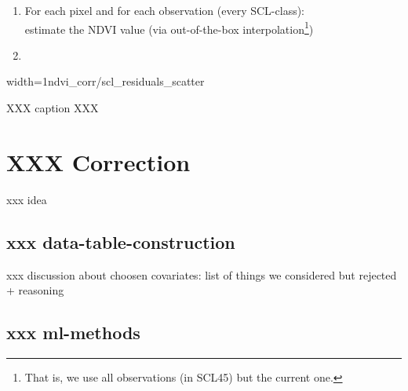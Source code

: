 \begin{enumerate}
    \item For each pixel and for each observation (every SCL-class):\\
          estimate the NDVI value (via out-of-the-box interpolation\footnote{That is, we use all observations (in SCL45) but the current one.})
    \item
\end{enumerate}







\begin{my_figure}[h]{width=1\textwidth}{ndvi_corr/scl_residuals_scatter}
    \caption{XXX caption XXX}
    \label{fig:ndvi_corr/scl_residuals_scatter}
\end{my_figure}


\section{XXX Correction}
xxx idea

\subsection{xxx data-table-construction}
xxx discussion about choosen covariates:
list of things we considered but rejected + reasoning

\subsection{xxx ml-methods}
